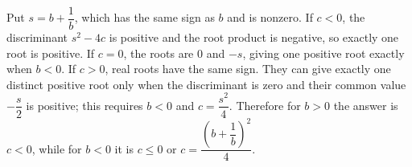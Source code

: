 Put $s=b+\dfrac{1}{b}$, which has the same sign as $b$ and is nonzero. If $c<0$, the discriminant $s^2-4c$ is positive and the root product is negative, so exactly one root is positive. If $c=0$, the roots are 0 and $-s$, giving one positive root exactly when $b<0$. If $c>0$, real roots have the same sign. They can give exactly one distinct positive root only when the discriminant is zero and their common value $-\dfrac{s}{2}$ is positive; this requires $b<0$ and $c=\dfrac{s^2}{4}$. Therefore for $b>0$ the answer is $\boxed{c<0}$, while for $b<0$ it is $\boxed{c\le0\text{ or }c=\dfrac{(b+\dfrac{1}{b})^2}{4}}$.

